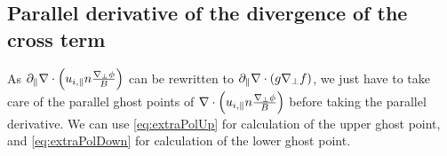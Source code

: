 \subsection{Parallel derivative of the divergence of the cross term}
%
As $\partial_\|\nabla\cdot \left( u_{i,\|}n \frac{\nabla_\perp \phi}{B}\right)$ can be rewritten to $\partial_\|\nabla\cdot(g\nabla_\perp f)$, we just have to take care of the parallel ghost points of $\nabla\cdot \left( u_{i,\|}n \frac{\nabla_\perp \phi}{B}\right)$ before taking the parallel derivative.
We can use \cref{eq:extraPolUp} for calculation of the upper ghost point, and \cref{eq:extraPolDown}  for calculation of the lower ghost point.
